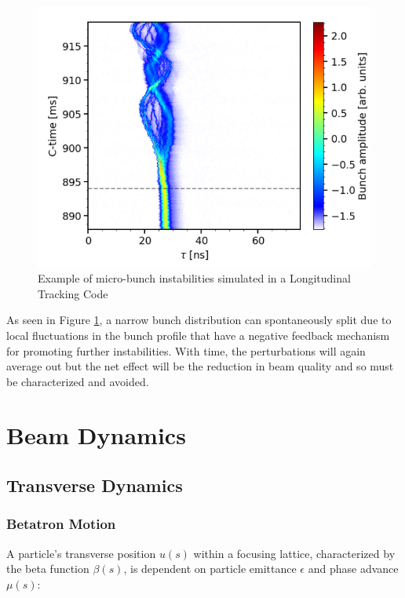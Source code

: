\begin{figure}
    \centering
    \includegraphics{figs/micro_bunching_instabilities.PNG}
    \caption{Example of micro-bunch instabilities simulated in a Longitudinal Tracking Code}
    \label{fig:microbunch_instabilities}
\end{figure}

As seen in Figure \ref{fig:microbunch_instabilities}, a narrow bunch distribution can spontaneously split due to local fluctuations in the bunch profile that have a negative feedback mechanism for promoting further instabilities. With time, the perturbations will again average out but the net effect will be the reduction in beam quality and so must be characterized and avoided.

\chapter{Beam Dynamics}

\section{Transverse Dynamics}

\subsection{Betatron Motion}

A particle's transverse position $u(s)$ within a focusing lattice, characterized by the beta function $\beta(s)$, is dependent on particle emittance $\epsilon$ and phase advance $\mu(s)$:

